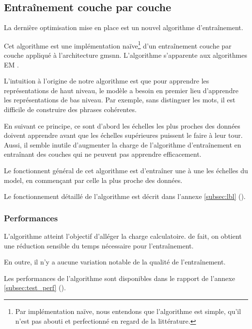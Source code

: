 \subsection{Entraînement couche par couche}\label{subsec:optilbl}
La dernière optimisation mise en place est un nouvel algorithme d'entraînement.

Cet algorithme est une implémentation naïve\footnote{Par \og implémentation naïve\fg{}, nous entendons que l'algorithme est simple, qu'il n'est pas abouti et perfectionné en regard de la littérature.} d'un entraînement couche par couche appliqué à l'architecture \gls{gmsnn}. L'algorithme s'apparente aux algorithmes EM . %

L'intuition à l'origine de notre algorithme est que pour apprendre les représentations de haut niveau, le modèle a besoin en premier lieu d'apprendre les représentations de bas niveau.
Par exemple, sans distinguer les mots, il est difficile de construire des phrases cohérentes.

En suivant ce principe, ce sont d'abord les échelles les plus proches des données doivent apprendre avant que les échelles supérieures puissent le faire à leur tour.
Aussi, il semble inutile d'augmenter la charge de l'algorithme d'entraînement en entraînant des couches qui ne peuvent pas apprendre efficacement.

Le fonctionnent général de cet algorithme est d'entraîner une à une les échelles du \gls{model}, en commençant par celle la plus proche des données.

Le fonctionnement détaillé de l'algorithme est décrit dans l'annexe \ref{subsec:lbl} ().

\subsubsection{Performances}

L'algorithme atteint l'objectif d'alléger la charge calculatoire. de fait, on obtient une réduction sensible du temps nécessaire pour l'entraînement.

En outre, il n'y a aucune variation notable de la qualité de l'entraînement.

Les performances de l'algorithme sont disponibles dans le rapport de l'annexe \ref{subsec:test_perf} ().

